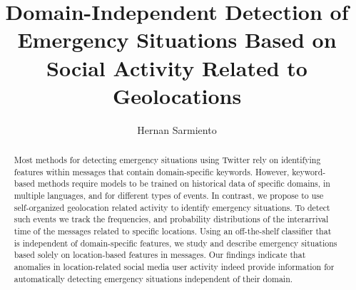 \documentclass{llncs}
\begin{document}
%
\frontmatter          %
%
\pagestyle{headings}  %
%

%
\mainmatter              %
%
\title{Domain-Independent Detection of Emergency Situations Based on Social  Activity Related to Geolocations}
%
%
\author{Hernan Sarmiento}
%
%
%

\maketitle              %

\begin{abstract}
Most methods for detecting emergency situations using Twitter rely on identifying features within messages that contain domain-specific keywords. However, keyword-based methods require models to be trained on historical data of specific domains, in multiple languages, and for different types of events.
%
%
%
%
In contrast, we propose to use self-organized geolocation related activity to identify emergency situations.
%
To detect such events we track the frequencies, and probability distributions of the interarrival time of the messages related to specific locations.
%
Using an off-the-shelf classifier that is independent of domain-specific features, we study and describe emergency situations based solely on location-based features in messages.
%
Our findings indicate that anomalies in location-related social media user activity indeed provide information for automatically detecting emergency situations independent of their domain.
\end{abstract}
%
\end{document}
